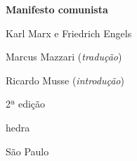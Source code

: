 




\begingroup\thispagestyle{empty}\vspace*{.05\textheight} 

              \formular
              \Huge
              \noindent
              \textbf{Manifesto comunista}
              
              {\brabo\LARGE
              \noindent Karl Marx e Friedrich Engels}
              \vspace{4cm}

              \newfontfamily{}
              {\fontsize{30}{40}\selectfont \minion\small\noindent Marcus Mazzari (\textit{tradução})}
              \vspace{-0.5cm}

              {\fontsize{30}{40}\selectfont \minion\small\noindent Ricardo Musse (\textit{introdução})}

              \noindent
              {\fontsize{30}{40}\selectfont\minion\small\noindent 2ª edição}

              \vfill
              \newfontfamily{}
              {\noindent\fontsize{30}{40}\selectfont \timesnewroman hedra}

              \vspace{-0.5cm}
              {\selectfont\minion\small\noindent São Paulo \quad\the\year}

\endgroup
\pagebreak
